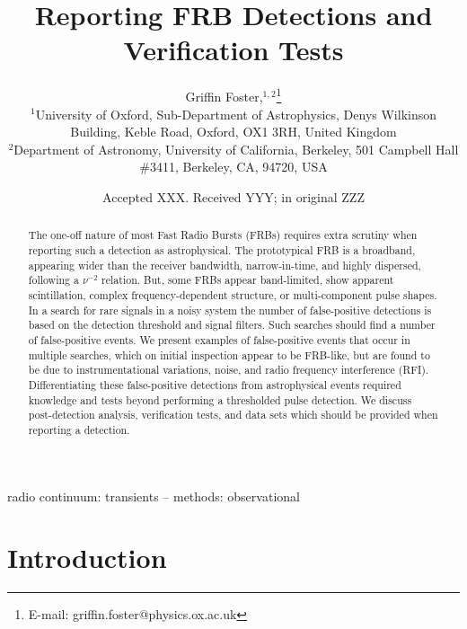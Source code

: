 \documentclass[a4paper,fleqn,usenatbib]{mnras}
\title[FRB Detections and Verification Tests]{Reporting FRB Detections
and Verification Tests}
\author[G. Foster et al.]{
Griffin Foster,$^{1,2}$\thanks{E-mail: griffin.foster@physics.ox.ac.uk}
\\
$^{1}$University of Oxford, Sub-Department of Astrophysics, Denys Wilkinson Building, Keble Road, Oxford, OX1 3RH, United Kingdom\\
$^{2}$Department of Astronomy, University of California, Berkeley, 501 Campbell
Hall \#3411, Berkeley, CA, 94720, USA\\
}
\date{Accepted XXX. Received YYY; in original ZZZ}
\begin{document}
\label{firstpage}
\pagerange{\pageref{firstpage}--\pageref{lastpage}}
\maketitle

\begin{abstract}
The one-off nature of most Fast Radio Bursts (FRBs) requires extra scrutiny when
reporting such a detection as astrophysical.  The prototypical FRB is a
broadband, appearing wider than the receiver bandwidth, narrow-in-time, and
highly dispersed, following a $\nu^{-2}$ relation.  But, some FRBs appear
band-limited, show apparent scintillation, complex frequency-dependent
structure, or multi-component pulse shapes.  In a search for rare signals in a
noisy system the number of false-positive detections is based on the detection
threshold and signal filters.  Such searches should find a number of
false-positive events.  We present examples of false-positive events that occur
in multiple searches, which on initial inspection appear to be FRB-like, but are
found to be due to instrumentational variations, noise, and radio frequency
interference (RFI).  Differentiating these false-positive detections from
astrophysical events required knowledge and tests beyond performing a
thresholded pulse detection.  We discuss post-detection analysis, verification
tests, and data sets which should be provided when reporting a detection.
\end{abstract}

\begin{keywords}
radio continuum: transients -- methods: observational
\end{keywords}


\section{Introduction}
\label{sec:intro}
\end{document}
